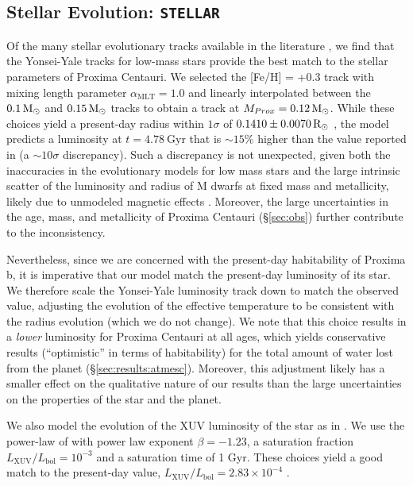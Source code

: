 \documentclass[preprint,12pt]{aastex}
\def\msun{{\rm\,M_\odot}}
\def\rsun{{\rm\,R_\odot}}
\def\eg{{\it e.g.\ }}
\def\stellar{\texttt{\footnotesize{STELLAR}}\xspace}
\begin{document}
\subsection{Stellar Evolution: \stellar}
\label{sec:models:stellar}

Of the many stellar evolutionary tracks available in the literature
\citep[\eg][]{Baraffe98,Dartmouth08,Baraffe15}, we find that the
Yonsei-Yale tracks for low-mass stars \citep{YonseiYale13} provide the
best match to the stellar parameters of Proxima Centauri. We selected
the [Fe/H] = +0.3 track with mixing length parameter
$\alpha_\mathrm{MLT} = 1.0$ and linearly interpolated between the $0.1
\msun$ and $0.15 \msun$ tracks to obtain a track at $M_{Prox} = 0.12
\msun$.  While these choices yield a present-day radius within
$1\sigma$ of $0.1410 \pm 0.0070 \rsun$ \citep{Boyajian12}, the model
predicts a luminosity at $t = 4.78\ \mathrm{Gyr}$ that is $\sim 15\%$
higher than the value reported in \cite{Boyajian12} (a $\sim 10\sigma$
discrepancy). Such a discrepancy is not unexpected, given both the
inaccuracies in the evolutionary models for low mass stars and the
large intrinsic scatter of the luminosity and radius of M dwarfs at
fixed mass and metallicity, likely due to unmodeled magnetic effects
\citep{YonseiYale13}. Moreover, the large uncertainties in the age,
mass, and metallicity of Proxima Centauri (\S\ref{sec:obs}) further
contribute to the inconsistency.

Nevertheless, since we are concerned with the present-day habitability
of Proxima b, it is imperative that our model match the present-day
luminosity of its star. We therefore scale the Yonsei-Yale luminosity
track down to match the observed value, adjusting the evolution of the
effective temperature to be consistent with the radius evolution
(which we do not change). We note that this choice results in a
\emph{lower} luminosity for Proxima Centauri at all ages, which yields
conservative results (``optimistic'' in terms of habitability) for the total amount of water
lost from the planet (\S\ref{sec:results:atmesc}). Moreover, this
adjustment likely has a smaller effect on the qualitative nature of
our results than the large uncertainties on the properties of the star
and the planet.

We also model the evolution of the XUV luminosity of the star as in
\cite{LugerBarnes15}. We use the power-law of \cite{Ribas05} with
power law exponent $\beta = -1.23$, a saturation fraction
$L_\mathrm{XUV}/L_\mathrm{bol} = 10^{-3}$ and a saturation time of 1
Gyr. These choices yield a good match to the present-day value,
$L_\mathrm{XUV}/L_\mathrm{bol} = 2.83\times 10^{-4}$
\citep{Boyajian12}.
\end{document}
